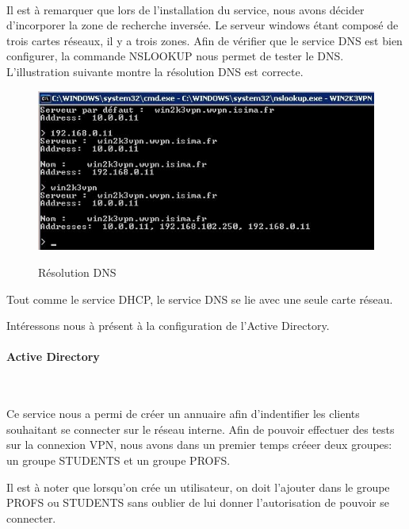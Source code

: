 ~\

Il est à remarquer que lors de l'installation du service, nous avons décider d'incorporer la zone de recherche inversée. Le serveur windows étant composé de trois cartes réseaux, il y a trois zones. Afin de vérifier que le service DNS est bien configurer, la commande NSLOOKUP nous permet de tester le DNS. 
L'illustration suivante montre la résolution DNS est correcte.

\begin{figure}[H]
	\begin{center}
		\includegraphics[width=\textwidth]{partie_2/screen_windows/nslookup.JPG}\\
	\end{center}
	\caption{Résolution DNS}
	\label{NSLOOKUP}
\end{figure}

Tout comme le service DHCP, le service DNS se lie avec une seule carte réseau. 

Intéressons nous à présent à la configuration de l'Active Directory.

\paragraph{Active Directory}
~\

Ce service nous a permi de créer un annuaire afin d'indentifier les clients souhaitant se connecter sur le réseau interne. Afin de pouvoir effectuer des tests sur la connexion VPN, nous avons dans un premier temps créeer deux groupes: un groupe STUDENTS et un groupe PROFS.

Il est à noter que lorsqu'on crée un utilisateur, on doit l'ajouter dans le groupe PROFS ou STUDENTS sans oublier de lui donner l'autorisation de pouvoir se connecter. 

